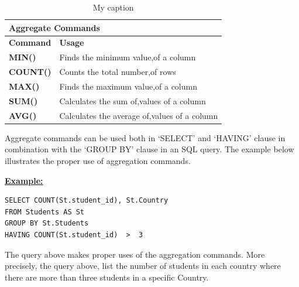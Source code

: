 \begin{table}[h]
\centering
\caption{My caption}
\label{my-label}
\begin{tabular}{|p{2cm}|p{11.5cm}| }
\hline
\multicolumn{2}{|l|}{\textbf{Aggregate Commands}}                                                             \\ \hline
\textbf{Command}                        & \textbf{Usage}                                                      \\ \hline
{\color[HTML]{333333} \textbf{MIN()}}   & {\color[HTML]{333333} Finds the minimum value,of a column}          \\ \hline
{\color[HTML]{333333} \textbf{COUNT()}} & {\color[HTML]{333333} Counts the total number,of rows}              \\ \hline
{\color[HTML]{333333} \textbf{MAX()}}   & {\color[HTML]{333333} Finds the maximum value,of a column}          \\ \hline
{\color[HTML]{333333} \textbf{SUM()}}   & {\color[HTML]{333333} Calculates the sum of,values of a column}     \\ \hline
{\color[HTML]{333333} \textbf{AVG()}}   & {\color[HTML]{333333} Calculates the average of,values of a column} \\ \hline
\end{tabular}
\end{table}

Aggregate commands can be used both in ‘SELECT’ and ‘HAVING’ clause in combination with the ‘GROUP BY’ clause in an SQL query. The example below illustrates the proper use of aggregation commands.

\hfill\newpage
\noindent\textbf{\underline{Example:}}
\begin{mdframed}[backgroundcolor=lightgray!20] 
\begin{lstlisting}[style=SQL]
SELECT COUNT(St.student_id), St.Country
FROM Students AS St 
GROUP BY St.Students
HAVING COUNT(St.student_id)  >  3
\end{lstlisting}
\end{mdframed}
The query above makes proper uses of the aggregation commands. More precisely, the query above, list the number of students in each country where there are more than three students in a specific Country. 


